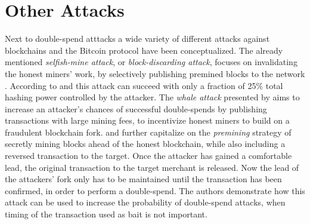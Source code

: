 \documentclass[a4paper,12pt,twoside]{report}
\begin{document}
\section{Other Attacks} \label{otherattacks}
Next to double-spend atttacks a wide variety of different attacks against blockchains and the Bitcoin protocol have been conceptualized. The already mentioned \textit{selfish-mine attack}, or \textit{block-discarding attack}, focuses on invalidating the honest miners' work, by selectively publishing premined blocks to the network \cite{mwalemodel,selfishmine1,selfishmine2,lessThanHalfDraft}. According to \cite{lessThanHalfDraft} and \cite{selfishmine1} this attack can succeed with only a fraction of 25\% total hashing power controlled by the attacker. The \textit{whale attack} presented by \cite{whaleattack} aims to increase an attacker's chances of successful double-spends by publishing transactions with large mining fees, to incentivize honest miners to build on a fraudulent blockchain fork. \cite{premining1} and \cite{premining2} further capitalize on the \textit{premining} strategy of secretly mining blocks ahead of the honest blockchain, while also including a reversed transaction to the target. Once the attacker has gained a comfortable lead, the original transaction to the target merchant is released. Now the lead of the attackers' fork only has to be maintained until the transaction has been confirmed, in order to perform a double-spend. The authors demonstrate how this attack can be used to increase the probability of double-spend attacks, when timing of the transaction used as bait is not important.
\end{document}
